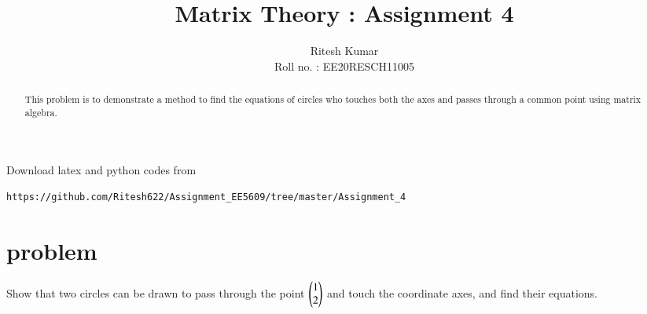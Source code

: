 \documentclass[journal,12pt,twocolumn]{IEEEtran}
\begin{document}
     \def\rightbox#1{\makebox[0in][r]{#1}}
     \def\centbox#1{\makebox[0in]{#1}}
     \def\topbox#1{\raisebox{-\baselineskip}[0in][0in]{#1}}
     \def\midbox#1{\raisebox{-0.5\baselineskip}[0in][0in]{#1}}
\vspace{3cm}
\title{ Matrix Theory : Assignment 4 }
\author{Ritesh Kumar \\ Roll no. : EE20RESCH11005 }
\maketitle
\newpage
\bigskip
	\renewcommand{\thefigure}{\theenumi}
\renewcommand{\thetable}{\theenumi}













\begin{abstract}
This problem is to demonstrate a method to find the equations of circles who touches both the axes and passes through a common point using matrix algebra.
\end{abstract}
Download latex and python codes from 
\begin{lstlisting}
https://github.com/Ritesh622/Assignment_EE5609/tree/master/Assignment_4
\end{lstlisting}

\section{problem}
Show that two circles can be drawn to pass through the point
 $ \begin{pmatrix} 1 \\ 2 \\	\end{pmatrix} $  and touch the coordinate axes, and find their equations.
\end{document}
